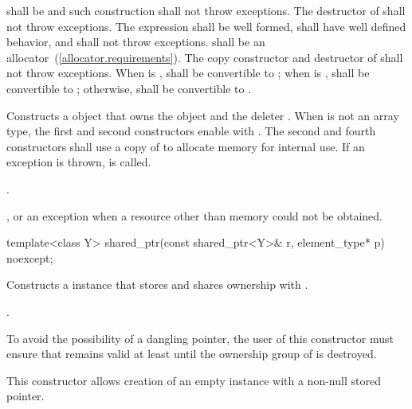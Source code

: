 \begin{itemdescr}
\pnum\requires {} shall be
 and such construction shall not throw exceptions.
The destructor of 
shall not throw exceptions. The expression  shall be
well formed, shall have well defined behavior, and shall not throw exceptions.
 shall be an allocator~(\ref{allocator.requirements}).
The copy constructor and destructor of  shall not throw exceptions.
When  is ,  shall be convertible to ;
when  is ,  shall be convertible to ;
otherwise,  shall be convertible to .

\pnum\effects  Constructs a  object that owns the
object  and the deleter .
When  is not an array type,
the first and second constructors enable  with .
The second and fourth constructors shall use a copy of  to
allocate memory for internal use.
If an exception is thrown,  is called.

\pnum\postconditions  {}.

\pnum\throws  {}, or an  exception
when a resource other than memory could not be obtained.
\end{itemdescr}

%
\begin{itemdecl}
template<class Y> shared_ptr(const shared_ptr<Y>& r, element_type* p) noexcept;
\end{itemdecl}

\begin{itemdescr}
\pnum
\effects Constructs a  instance that
stores  and shares ownership with .

\pnum
\postconditions {}.

\pnum
\begin{note} To avoid the possibility of a dangling pointer, the
user of this constructor must ensure that  remains valid at
least until the ownership group of  is destroyed. \end{note}

\pnum
\begin{note} This constructor allows creation of an empty
 instance with a non-null stored pointer. \end{note}
\end{itemdescr}


